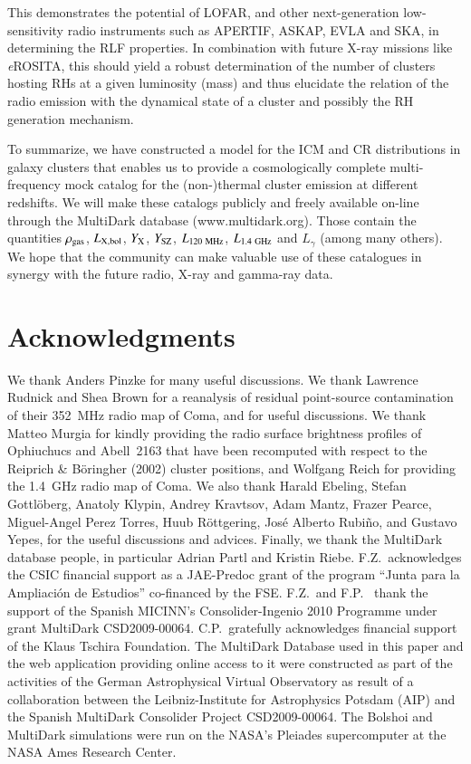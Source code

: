 \documentclass[useAMS,usenatbib]{mn2e}
\begin{document}
This demonstrates the potential of LOFAR, and other next-generation
low-sensitivity radio instruments such as APERTIF, ASKAP, EVLA and SKA, in
determining the RLF properties. In combination with future X-ray missions like
\emph{e}ROSITA, this should yield a robust determination of the number of
clusters hosting RHs at a given luminosity (mass) and thus elucidate the
relation of the radio emission with the dynamical state of a cluster and
possibly the RH generation mechanism.

To summarize, we have constructed a model for the ICM and CR distributions in
galaxy clusters that enables us to provide a cosmologically complete
multi-frequency mock catalog for the (non-)thermal cluster emission at different
redshifts. We will make these catalogs publicly and freely available on-line
through the MultiDark database (www.multidark.org). Those contain the quantities
$\rho_{{\mathrm{gas}}}$, $L_{{\mathrm{X, bol}}}$, $Y_{{\mathrm{X}}}$, $Y_{{\mathrm{SZ}}}$,
$L_{120~{\mathrm{MHz}}}$, $L_{1.4~{\mathrm{GHz}}}$ and $L_{\gamma}$ (among many
others). We hope that the community can make valuable use of these catalogues in
synergy with the future radio, X-ray and gamma-ray data.


\section*{Acknowledgments}
We thank Anders Pinzke for many useful discussions. We thank Lawrence Rudnick
and Shea Brown for a reanalysis of residual point-source contamination of their
352~MHz radio map of Coma, and for useful discussions. We thank Matteo
Murgia for kindly providing the radio surface brightness profiles of Ophiuchucs
and Abell~2163 that have been recomputed with respect to the Reiprich \&
B\"{o}ringher (2002) cluster positions, and Wolfgang Reich for providing the
1.4~GHz radio map of Coma.  We also thank Harald Ebeling, Stefan Gottl{\"o}berg,
Anatoly Klypin, Andrey Kravtsov, Adam Mantz, Frazer Pearce, Miguel-Angel Perez
Torres, Huub R{\"o}ttgering, Jos\'e Alberto Rubi\~no, and Gustavo Yepes, for the
useful discussions and advices.  Finally, we thank the MultiDark database
people, in particular Adrian Partl and Kristin Riebe. F.Z.{\ }acknowledges the
CSIC financial support as a JAE-Predoc grant of the program ``Junta para la
Ampliaci\'on de Estudios'' co-financed by the FSE. F.Z.{\ }and F.P.{\ } thank
the support of the Spanish MICINN's Consolider-Ingenio 2010 Programme under
grant MultiDark CSD2009-00064. C.P.{\ }gratefully acknowledges financial support
of the Klaus Tschira Foundation. The MultiDark Database used in this paper and
the web application providing online access to it were constructed as part of
the activities of the German Astrophysical Virtual Observatory as result of a
collaboration between the Leibniz-Institute for Astrophysics Potsdam (AIP) and
the Spanish MultiDark Consolider Project CSD2009-00064. The Bolshoi and
MultiDark simulations were run on the NASA's Pleiades supercomputer at the NASA
Ames Research Center.
\end{document}
